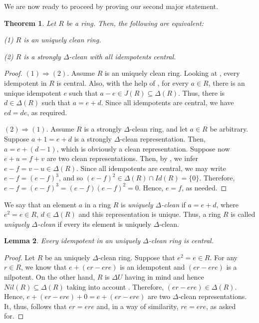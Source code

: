 \documentclass[12pt]{amsart}
\newtheorem{theorem}{Theorem}[section]
\newtheorem{lemma}[theorem]{Lemma}
\theoremstyle{definition}
\begin{document}
\medskip

We are now ready to proceed by proving our second major statement.

\begin{theorem}\label{cor 2}
Let $R$ be a ring. Then, the following are equivalent:

(1) $R$ is an uniquely clean ring.

(2) $R$ is a strongly $\Delta$-clean with all idempotents central.
\end{theorem}

\begin{proof}
$(1)\Rightarrow(2)$. Assume \(R\) is an uniquely clean ring. Looking at \cite[Lemma 4]{nzu}, every idempotent in \(R\) is central. Also, with the help of \cite[Theorem 20]{nzu}, for every \(a \in R\), there is an unique idempotent \(e\) such that \(a - e \in J(R) \subseteq \Delta(R)\). Thus, there is \(d \in \Delta(R)\) such that \(a = e + d\). Since all idempotents are central, we have \(ed = de\), as required.

$(2)\Rightarrow (1)$. Assume \(R\) is a strongly $\Delta$-clean ring, and let \(a \in R\) be arbitrary. Suppose \(a+1 = e + d\) is a strongly $\Delta$-clean representation. Then, \(a = e + (d-1)\), which is obviously a clean representation. Suppose now \(e + u = f + v\) are two clean representations. Then, by \cite [Proposition 2.3]{kkqt}, we infer \(e - f = v - u \in \Delta(R)\). Since all idempotents are central, we may write \(e - f = (e-f)^3\), and so \((e-f)^2 \in \Delta(R) \cap Id(R) = \{0\}\). Therefore, \(e - f = (e-f)^3 = (e-f)(e-f)^2 = 0\). Hence, \(e = f\), as needed.
\end{proof}

We say that an element $a$ in a ring $R$ is {\it uniquely $\Delta$-clean} if $a = e + d$, where $e^2 = e\in R$, $d \in \Delta(R)$ and this representation is unique. Thus, a ring $R$ is called {\it uniquely $\Delta$-clean} if every its element is uniquely $\Delta$-clean.

\begin{lemma}\label{uniquely}
Every idempotent in an uniquely $\Delta$-clean ring is central.
\end{lemma}

\begin{proof}
Let $R$ be an uniquely $\Delta$-clean ring. Suppose that $e^2=e\in R$. For any $r\in R$, we know that $e+(er-ere)$ is an idempotent and $(er-ere)$ is a nilpotent. On the other hand, $R$ is $\Delta U$ having in mind \cite[Theorem 4.2]{kkqt} and hence $Nil(R)\subseteq \Delta(R)$ taking into account \cite [Proposition 2.4(3)]{kkqt}. Therefore, $(er-ere)\in \Delta(R)$. Hence, $e+(er-ere)+0=e+(er-ere)$ are two $\Delta$-clean representations. It, thus, follows that $er=ere$ and, in a way of similarity, $re=ere$, as asked for.
\end{proof}
\end{document}
